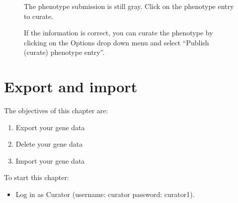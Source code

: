 \begin{figure}[ht]
  \begin{shaded}
	  \caption{The phenotype submission is still gray. 
	  Click on the phenotype entry to curate.}
		\label{fig:curate_V}
  \end{shaded}
\end{figure}

\begin{figure}[ht]
  \begin{shaded}
	  \caption{If the information is correct, you can curate the phenotype by clicking on the Options drop down menu
	   and select ``Publish (curate) phenotype entry''. }
		\label{fig:curate_VI}
  \end{shaded}
\end{figure}









\chapter{Export and import}
The objectives of this chapter are:
\begin{enumerate}
	\item 
	Export your gene data
	\item 
	Delete your gene data
	\item
	Import your gene data
\end{enumerate}
To start this chapter:
\begin{itemize}
	\item
	Log in as Curator (username: curator password: curator1).
\end{itemize}

